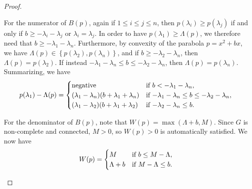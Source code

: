 \documentclass[a4paper,11pt]{article}
\theoremstyle{definition}
\begin{document}
\begin{proof}
\begin{itemize}
    For the numerator of $B(p)$, again if $1\le i \le j \le n$, then $p(\lambda_i)\ge p(\lambda_j)$ if and only if $b\ge -\lambda_i-\lambda_j$ or $\lambda_i=\lambda_j$. In order to have $p(\lambda_1)\ge \Lambda(p)$, we therefore need that $b\ge -\lambda_1-\lambda_n$. Furthermore, by convexity of the parabola $p=x^2+bx$, we have $\Lambda(p)\in \left\{p(\lambda_2),p(\lambda_n)\right\}$, and if $b\ge -\lambda_2-\lambda_n$, then $\Lambda(p)=p(\lambda_2)$. If instead $-\lambda_1-\lambda_n \le b \le -\lambda_2-\lambda_n$, then $\Lambda(p)=p(\lambda_n)$. Summarizing, we have 
    \[p(\lambda_1)-\Lambda(p)=\begin{cases}
        $negative$ &$if $b<-\lambda_1-\lambda_n,\\
        (\lambda_1-\lambda_n)(b+\lambda_1+\lambda_n) &$if $-\lambda_1-\lambda_n \le b \le -\lambda_2 - \lambda_n,\\
        (\lambda_1-\lambda_2)(b+\lambda_1+\lambda_2) &$if $-\lambda_2-\lambda_n \le b.
    \end{cases}\]

    For the denominator of $B(p)$, note that $W(p)=\max(\Lambda+b,M)$. Since $G$ is non-complete and connected, $M>0$, so $W(p)>0$ is automatically satisfied. We now have
    \[W(p)=\begin{cases}
        M &$if $b\le M-\Lambda,\\
        \Lambda+b &$if $M-\Lambda\le b.
    \end{cases}\]


\end{itemize}
\end{proof}
\end{document}
